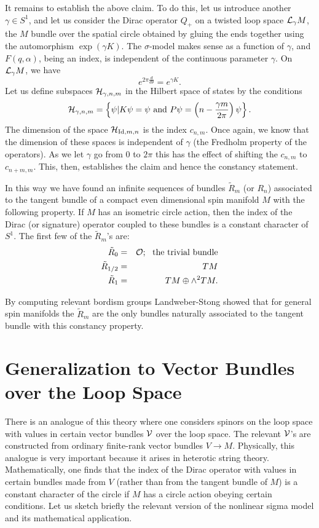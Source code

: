 It remains to establish the above claim.
To do this, let us introduce another $\gamma\in S^1$, and let us
consider the Dirac operator $Q_+$ on a twisted loop space ${\cal L}_\gamma
M$, the $M$ bundle over the spatial circle obtained by gluing the ends
together using the automorphism $\exp(\gamma K)$. 
The $\sigma$-model makes sense as a function
of $\gamma$, and $F(q,\alpha)$, being an index, is independent of the
continuous parameter $\gamma$.
On ${\cal L}_\gamma M$, we have
$$e^{2\pi \frac{d}{d\theta}}=e^{\gamma K}.$$
Let us define subspaces 
${\cal H}_{\gamma,n,m}$
in the Hilbert space of states by the conditions
$${\cal H}_{\gamma,n,m}=\left\{\psi|K\psi=\psi \ {\rm and}\ 
P\psi=\left(n-\frac{\gamma m}{2\pi}\right)\psi\right\}.$$
The dimension of the space ${\cal H}_{{\rm Id},m,n}$ is the index $c_{n,m}$.
Once again, we know that the dimension of these spaces is independent
of $\gamma$ (the Fredholm property of the operators). As we let
$\gamma$ go from $0$ to $2\pi$ this has the effect of shifting the
$c_{n,m}$ to $c_{n+m,m}$. This, then, establishes the claim and hence
the constancy statement.

In this way we have found an infinite sequences of bundles $\tilde R_m$
(or $R_n$)
associated to the tangent bundle of a compact even dimensional spin
manifold $M$ with the following property.
If $M$ has an isometric circle action, then the index of the Dirac (or
signature)
operator coupled to these bundles is a constant character of
$S^1$. 
The first few of the $\tilde R_m$'s are:
\begin{eqnarray*}
\tilde R_0 & = & {\cal O}; \ \ {\rm the\ trivial\ bundle} \\
\tilde R_{1/2} & = & TM \\
\tilde R_1 & = & TM\oplus \wedge^2TM.
\end{eqnarray*}

By computing relevant bordism groups Landweber-Stong showed that for
general spin manifolds the $\tilde R_m$  are the only bundles
naturally associated to the tangent bundle with this constancy property.



\section{Generalization to Vector Bundles over the Loop Space}

There is an analogue of this theory  where one
considers spinors on the loop space with values in certain
 vector bundles ${\cal 
V}$
over the loop space.  The relevant ${\cal V}$'s are constructed
from ordinary finite-rank vector bundles $V\to M$.
Physically, this analogue is very important because it
arises in heterotic string theory.
Mathematically, one finds that
 the index of the Dirac operator with values in certain bundles made
 from $V$ (rather than from the tangent bundle of $M$)  is a constant
character of the circle if $M$ has a circle action obeying certain conditions.
Let us sketch briefly the relevant version of the nonlinear sigma model and
its mathematical application.

